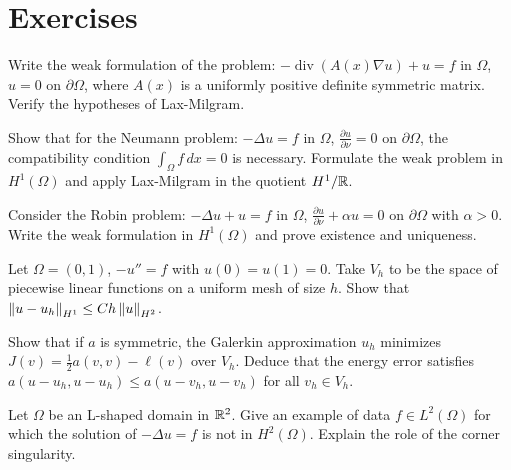 \section{Exercises}

\begin{exercise}
Write the weak formulation of the problem:
$-\operatorname{div}(A(x)\nabla u) + u = f$ in $\Omega$, $u = 0$ on $\partial\Omega$,
where $A(x)$ is a uniformly positive definite symmetric matrix. Verify the
hypotheses of Lax-Milgram.
\end{exercise}

\begin{exercise}
Show that for the Neumann problem:
$-\Delta u = f$ in $\Omega$, $\frac{\partial u}{\partial \nu} = 0$ on
$\partial\Omega$, the compatibility condition $\int_\Omega f\, dx = 0$ is
necessary. Formulate the weak problem in $H^1(\Omega)$ and apply Lax-Milgram
in the quotient $H^1/\mathbb{R}$.
\end{exercise}

\begin{exercise}
Consider the Robin problem: $-\Delta u + u = f$ in $\Omega$,
$\frac{\partial u}{\partial \nu} + \alpha u = 0$ on $\partial\Omega$ with
$\alpha > 0$. Write the weak formulation in $H^1(\Omega)$ and prove existence
and uniqueness.
\end{exercise}

\begin{exercise}
Let $\Omega = (0,1)$, $-u'' = f$ with $u(0) = u(1) = 0$. Take $V_h$ to be the
space of piecewise linear functions on a uniform mesh of size $h$. Show that
$\left\| u - u_h \right\|_{H^1} \leq C h \left\| u \right\|_{H^2}$.
\end{exercise}

\begin{exercise}
Show that if $a$ is symmetric, the Galerkin approximation $u_h$ minimizes
$J(v) = \frac{1}{2}a(v,v) - \ell(v)$ over $V_h$. Deduce that the energy error
satisfies $a(u - u_h, u - u_h) \leq a(u - v_h, u - v_h)$ for all $v_h \in V_h$.
\end{exercise}

\begin{exercise}
Let $\Omega$ be an L-shaped domain in $\mathbb{R}^2$. Give an example of data
$f \in L^2(\Omega)$ for which the solution of $-\Delta u = f$ is not in
$H^2(\Omega)$. Explain the role of the corner singularity.
\end{exercise}

